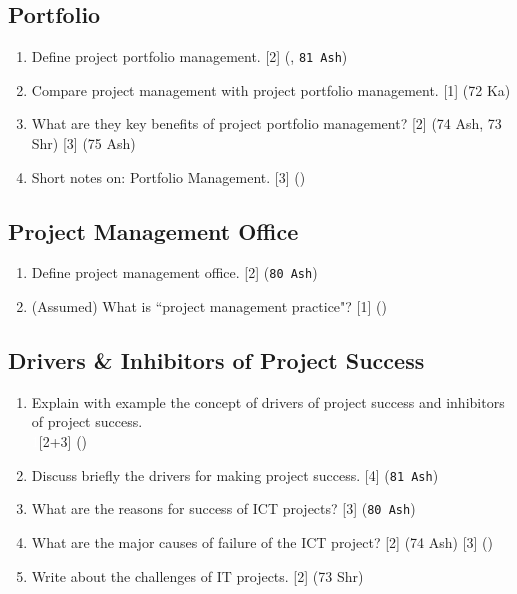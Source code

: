 \documentclass[12pt]{article}
\newcommand{\enter}{\\\textcolor{white}{1}}
\begin{document}
  \subsection{Portfolio}
    \begin{enumerate}
      \item Define project portfolio management. \hfill [2] (, \texttt{81 Ash})

      \item Compare project management with project portfolio management. \hfill [1] (72 Ka)

      \item What are they key benefits of project portfolio management? \hfill [2] (74 Ash, 73 Shr) [3] (75 Ash)
      
      \item Short notes on: Portfolio Management. \hfill [3] ()
    \end{enumerate}

  \subsection{Project Management Office}
    \begin{enumerate}
      \item Define project management office. \hfill [2] (\texttt{80 Ash})

      \item (Assumed) What is ``project management practice"? \hfill [1] ()
    \end{enumerate}

    \subsection{Drivers \& Inhibitors of Project Success}
    \begin{enumerate}
      \item Explain with example the concept of drivers of project success and inhibitors of project success. 
      \enter\hfill [2+3] ()

      \item Discuss briefly the drivers for making project success. \hfill [4] (\texttt{81 Ash})

      \item What are the reasons for success of ICT projects? \hfill [3] (\texttt{80 Ash})

      \item What are the major causes of failure of the ICT project? \hfill [2] (74 Ash) [3] ()

      \item Write about the challenges of IT projects. \hfill [2] (73 Shr)
    \end{enumerate}
\end{document}
